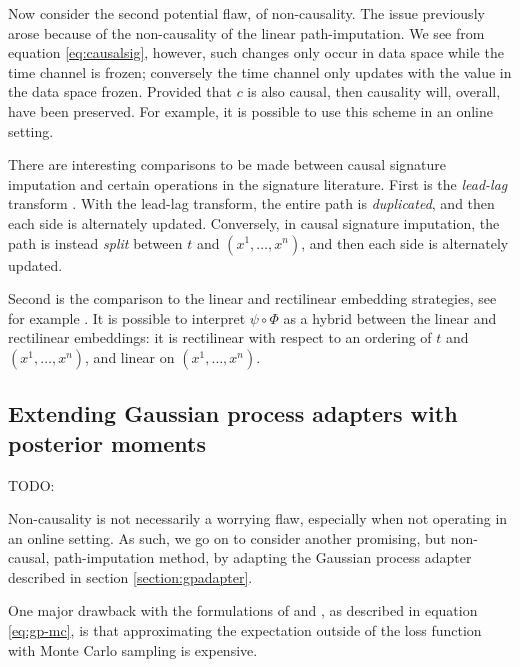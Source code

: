\documentclass{article}
\begin{document}
Now consider the second potential flaw, of non-causality. The issue previously arose because of the non-causality of the linear path-imputation. We see from equation \eqref{eq:causalsig}, however, such changes only occur in data space while the time channel is frozen; conversely the time channel only updates with the value in the data space frozen. Provided that $c$ is also causal, then causality will, overall, have been preserved. For example, it is possible to use this scheme in an online setting.

There are interesting comparisons to be made between causal signature imputation and certain operations in the signature literature. First is the \emph{lead-lag} transform \cite{primer2016}. With the lead-lag transform, the entire path is \emph{duplicated}, and then each side is alternately updated. Conversely, in causal signature imputation, the path is instead \emph{split} between $t$ and $(x^1, \ldots, x^n)$, and then each side is alternately updated.

Second is the comparison to the linear and rectilinear embedding strategies, see for example \cite{fermanian2019embedding}. It is possible to interpret $\psi \circ \Phi$ as a hybrid between the linear and rectilinear embeddings: it is rectilinear with respect to an ordering of $t$ and $(x^1, \ldots, x^n)$, and linear on $(x^1, \ldots, x^n)$.

\subsection{Extending Gaussian process adapters with posterior moments}\label{section:ourgpadapter}
TODO: %

Non-causality is not necessarily a worrying flaw, especially when not operating in an online setting. As such, we go on to consider another promising, but non-causal, path-imputation method, by adapting the Gaussian process adapter described in section \ref{section:gpadapter}.

One major drawback with the formulations of \cite{li2016scalable} and \cite{futoma2017mgp}, as described in equation \eqref{eq:gp-mc}, is that approximating the expectation outside of the loss function with Monte Carlo sampling is expensive.
\end{document}
